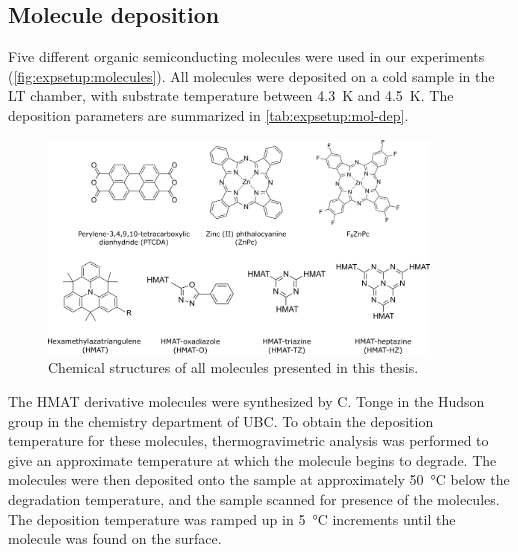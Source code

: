 \subsection*{Molecule deposition}

Five different organic semiconducting molecules were used in our experiments (\autoref{fig:expsetup:molecules}). All molecules were deposited on a cold sample in the \ac{LT} chamber, with substrate temperature between \SI{4.3}{K} and \SI{4.5}{K}. The deposition parameters are summarized in \autoref{tab:expsetup:mol-dep}. 

\begin{figure} [H]
    \centering
    \includegraphics[width=0.9\textwidth]{pictures/chemical_structures.png}
    \caption{Chemical structures of all molecules presented in this thesis. }
    \label{fig:expsetup:molecules}
\end{figure}

The \ac{HMAT} derivative molecules were synthesized by C. Tonge in the Hudson group in the chemistry department of \ac{UBC}. To obtain the deposition temperature for these molecules, thermogravimetric analysis was performed to give an approximate temperature at which the molecule begins to degrade. The molecules were then deposited onto the sample at approximately \SI{50}{\celsius} below the degradation temperature, and the sample scanned for presence of the molecules. The deposition temperature was ramped up in \SI{5}{\celsius} increments until the molecule was found on the surface.

